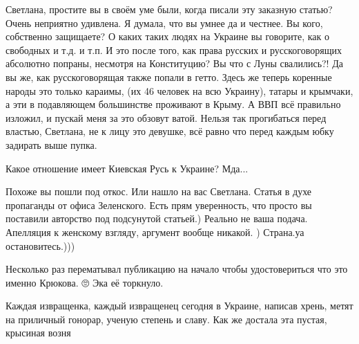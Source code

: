 \begin{itemize}
 

Светлана, простите вы в своём уме были, когда писали эту заказную статью? Очень
неприятно удивлена. Я думала, что вы умнее да и честнее. Вы кого, собственно
защищаете? О каких таких людях на Украине вы говорите, как о свободных и т.д. и
т.п. И это после того, как права русских и русскоговорящих абсолютно попраны,
несмотря на Конституцию? Вы что с Луны свалились?! Да вы же, как
русскоговорящая также попали в гетто. Здесь же теперь коренные народы это
только караимы, (их 46 человек на всю Украину), татары и крымчаки, а эти в
подавляющем большинстве проживают в Крыму. А ВВП всё правильно изложил, и
пускай меня за это обзовут ватой. Нельзя так прогибаться перед властью,
Светлана, не к лицу это девушке, всё равно что перед каждым юбку задирать выше
пупка.


 

Какое отношение имеет Киевская Русь к Украине?
Мда...

 

Похоже вы пошли под откос. Или нашло на вас Светлана. Статья в духе пропаганды
от офиса Зеленского. Есть прям уверенность, что просто вы поставили авторство
под подсунутой статьей.) Реально не ваша подача. Апелляция к женскому взгляду,
аргумент вообще никакой. ) Страна.уа остановитесь.)))

 

Несколько раз перематывал публикацию на начало чтобы удостовериться что это
именно Крюкова. 🙄 Эка её торкнуло.


 

Каждая извращенка, каждый извращенец сегодня в Украине, написав хрень, метят на
приличный гонорар, ученую степень и славу. Как же достала эта пустая, крысиная
возня


\end{itemize}

